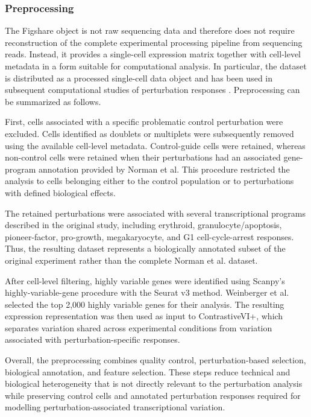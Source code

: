 \documentclass[11pt,a4paper]{article}
\begin{document}
\subsubsection{Preprocessing}

The Figshare object is not raw sequencing data and therefore does
not require reconstruction of the complete experimental processing pipeline
from sequencing reads. Instead, it provides a single-cell expression matrix
together with cell-level metadata in a form suitable for computational
analysis. In particular, the dataset is distributed as a processed
single-cell data object and has been used in subsequent computational studies
of perturbation responses \cite{weinberger2024figshare}. Preprocessing can be summarized as follows.

First, cells associated with a specific problematic control perturbation were excluded. Cells identified as doublets or multiplets were subsequently removed using the available cell-level metadata. Control-guide cells were retained, whereas non-control cells were retained when their perturbations had an associated gene-program annotation provided by Norman et al. This procedure restricted the analysis to cells belonging either to the control population or to perturbations with defined biological effects.

The retained perturbations were associated with several transcriptional programs described in the original study, including erythroid, granulocyte/apoptosis, pioneer-factor, pro-growth, megakaryocyte, and G1 cell-cycle-arrest responses. Thus, the resulting dataset represents a biologically annotated subset of the original experiment rather than the complete Norman et al. dataset.

After cell-level filtering, highly variable genes were identified using Scanpy's highly-variable-gene procedure with the Seurat v3 method. Weinberger et al. selected the top 2,000 highly variable genes for their analysis. The resulting expression representation was then used as input to ContrastiveVI+, which separates variation shared across experimental conditions from variation associated with perturbation-specific responses.

Overall, the preprocessing combines quality control, perturbation-based selection, biological annotation, and feature selection. These steps reduce technical and biological heterogeneity that is not directly relevant to the perturbation analysis while preserving control cells and annotated perturbation responses required for modelling perturbation-associated transcriptional variation. \\
\end{document}
